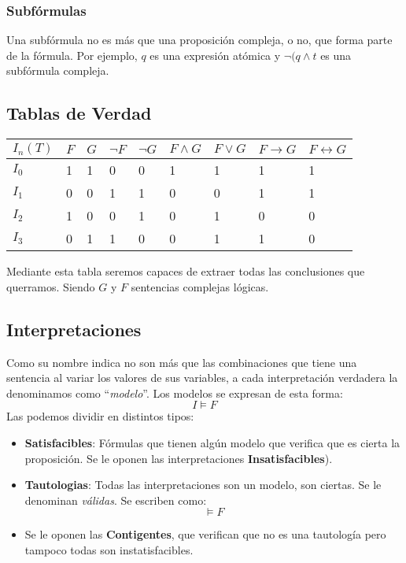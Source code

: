 \subsubsection{Subfórmulas}
\noindent Una subfórmula no es más que una proposición compleja, o no, que forma parte de la fórmula. Por ejemplo, \(q\) es una expresión atómica y \(\neg(q \land t\) es una subfórmula compleja.
\subsection{Tablas de Verdad}
\vspace{.75cm}
\begin{table}[h]
        \begin{tabular}{l|l|l|l|l|l|l|l|l}
                \(I_n(T)\) & \(F\) & \(G\) & \(\neg F\) & \(\neg G\) & \(F\land G\) & \(F\lor G\) & \(F\rightarrow G\) & \(F\leftrightarrow G\) \\ \hline
                \(I_0\)    & 1     & 1     & 0          & 0          & 1            & 1           & 1                  & 1                      \\ \hline
                \(I_1\)    & 0     & 0     & 1          & 1          & 0            & 0           & 1                  & 1                      \\ \hline
                \(I_2\)    & 1     & 0     & 0          & 1          & 0            & 1           & 0                  & 0                      \\ \hline
                \(I_3\)    & 0     & 1     & 1          & 0          & 0            & 1           & 1                  & 0
        \end{tabular}
\end{table}
\noindent Mediante esta tabla seremos capaces de extraer todas las conclusiones que querramos. Siendo \(G\) y \(F\) sentencias complejas lógicas.
\subsection{Interpretaciones}
\noindent Como su nombre indica no son más que las combinaciones que tiene una sentencia al variar los valores de sus variables, a cada interpretación verdadera la denominamos como ``\textit{modelo}''. Los modelos se expresan de esta forma:
\[
        \boxed{I \models F}
\]
\noindent Las podemos dividir en distintos tipos:
\begin{itemize}
        \item \textbf{Satisfacibles}: Fórmulas que tienen algún modelo que verifica que es cierta la proposición. Se le oponen las interpretaciones \textbf{Insatisfacibles}).
        \item \textbf{Tautologias}: Todas las interpretaciones son un modelo, son ciertas. Se le denominan \textit{válidas}. Se escriben como:
              \[ \models F\]
        \item Se le oponen las \textbf{Contigentes}, que verifican que no es una tautología pero tampoco todas son instatisfacibles.
\end{itemize}
